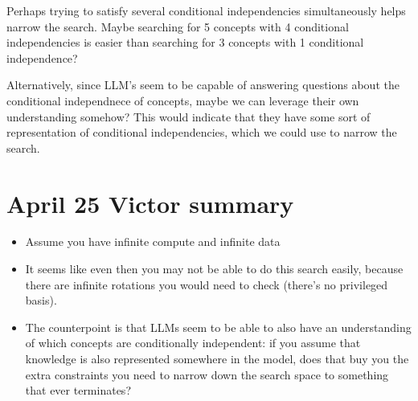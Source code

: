\documentclass{article}
\begin{document}
Perhaps trying to satisfy several conditional independencies simultaneously helps narrow the search. Maybe searching for 5 concepts with 4 conditional independencies is easier than searching for 3 concepts with 1 conditional independence?

Alternatively, since LLM's seem to be capable of answering questions about the conditional independnece of concepts, maybe we can leverage their own understanding somehow? This would indicate that they have some sort of representation of conditional independencies, which we could use to narrow the search.

\newpage
\appendix{}

\section{April 25 Victor summary}
\begin{itemize}
    \item Assume you have infinite compute and infinite data
    \item It seems like even then you may not be able to do this search easily, because there are infinite rotations you would need to check (there's no privileged basis).
    \item The counterpoint is that LLMs seem to be able to also have an understanding of which concepts are conditionally independent: if you assume that knowledge is also represented somewhere in the model, does that buy you the extra constraints you need to narrow down the search space to something that ever terminates?
\end{itemize}
\end{document}

